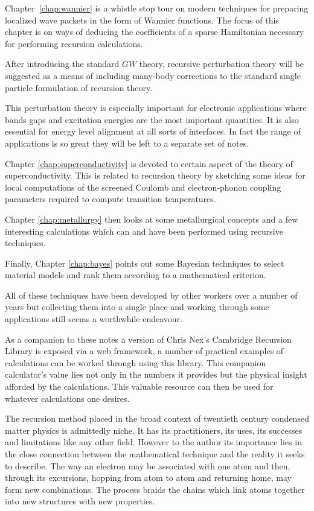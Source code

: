 Chapter~\ref{chap:wannier} is a whistle stop tour 
on modern techniques for preparing localized wave packets in the 
form of Wannier functions. The focus of this chapter is on 
ways of deducing the coefficients of a sparse Hamiltonian
necessary for performing recursion calculations.

After introducing the standard $GW$ theory, recursive perturbation theory
will be suggested as a means of including many-body corrections 
to the standard single particle formulation of recursion theory. 

This perturbation theory is especially important for electronic 
applications where bands gaps and excitation energies 
are the most important quantities. It is also essential for
energy level alignment at all sorts of interfaces. In fact the range
of applications is so great they will be left to a separate set of notes.

Chapter \ref{chap:superconductivity} is devoted to
certain aspect of the theory of superconductivity. 
This is related to recursion theory by sketching some ideas for 
local computations of the screened Coulomb and electron-phonon
coupling parameters required to compute transition temperatures.

Chapter \ref{chap:metallurgy} then looks at some metallurgical concepts 
and a few interesting calculations which can and have been performed 
using recursive techniques. 

Finally, Chapter \ref{chap:bayes} points out some Bayesian techniques 
to select material models and rank them according to a mathematical criterion.

All of these techniques have been developed by other workers 
over a number of years but collecting them into a single place 
and working through some applications still seems a worthwhile 
endeavour. 

As a companion to these notes a version of Chris Nex's Cambridge Recursion Library
is exposed via a web framework, a number of practical examples of calculations can
be worked through using this library. This companion calculator's value lies not only
in the numbers it provides but the physical insight afforded by the calculations.
This valuable resource can then be used for whatever calculations one desires.

The recursion method placed in the broad context of twentieth century condensed matter physics
is admittedly niche. It has its practitioners, its uses, 
its successes and limitations like any other field.
However to the author its importance lies in the close connection between the mathematical
technique and the reality it seeks to describe. The way an electron may be associated with 
one atom and then, through its excursions, hopping from atom to atom and returning home,
may form new combinations. The process braids the chains which link atoms together into 
new structures with new properties.

